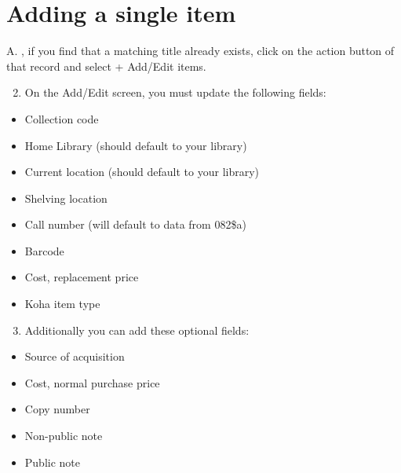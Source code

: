 \documentclass[letterpaper,10pt,english]{sphinxmanual}
\begin{document}
\section{Adding a single item}
\label{\detokenize{title-already-exists/adding-an-item:adding-a-single-item}}
A. , if you
find that a matching title already exists, click on the action button of
that record and select + Add/Edit items.
\begin{enumerate}
\setcounter{enumi}{1}
\item {} 
On the Add/Edit screen, you must update the following fields:

\end{enumerate}
\begin{itemize}
\item {} 
Collection code

\item {} 
Home Library (should default to your library)

\item {} 
Current location (should default to your library)

\item {} 
Shelving location

\item {} 
Call number (will default to data from 082\$a)

\item {} 
Barcode

\item {} 
Cost, replacement price

\item {} 
Koha item type

\end{itemize}
\begin{enumerate}
\setcounter{enumi}{2}
\item {} 
Additionally you can add these optional fields:

\end{enumerate}
\begin{itemize}
\item {} 
Source of acquisition

\item {} 
Cost, normal purchase price

\item {} 
Copy number

\item {} 
Non-public note

\item {} 
Public note

\end{itemize}
\end{document}
